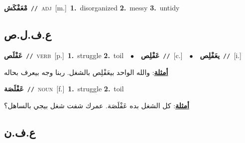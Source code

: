 \documentclass[10pt,a4paper,twoside]{article} %
\begin{document}
\begin{multicols}{2}
{\setlength\topsep{0pt}\textbf{\foreignlanguage{arabic}{مْعَفْكَش}}\ {\color{gray}\texttt{//}\color{black}}\ \textsc{adj}\ [m.]\ \textbf{1.}~disorganized  \textbf{2.}~messy  \textbf{3.}~untidy\ } \vspace{2mm}

\vspace{-3mm}
\subsection*{\color{blue}\foreignlanguage{arabic}{ع.ف.ل.ص}\color{blue}{}} 

{\setlength\topsep{0pt}\textbf{\foreignlanguage{arabic}{عَفْلَص}}\ {\color{gray}\texttt{//}\color{black}}\ \textsc{verb}\ [p.]\ \textbf{1.}~struggle  \textbf{2.}~toil\ \ $\bullet$\ \ \setlength\topsep{0pt}\textbf{\foreignlanguage{arabic}{عَفْلِص}}\ {\color{gray}\texttt{//}\color{black}}\ [c.]\ \ $\bullet$\ \ \setlength\topsep{0pt}\textbf{\foreignlanguage{arabic}{يعَفْلِص}}\ {\color{gray}\texttt{//}\color{black}}\ [i.]\  \begin{flushright}\color{gray}\foreignlanguage{arabic}{\textbf{\underline{\foreignlanguage{arabic}{أمثلة}}}: والله الواحد بيعَفْلِص بالشغل. ربنا وجه بيعرف بحاله}\end{flushright}\color{black}} \vspace{2mm}

{\setlength\topsep{0pt}\textbf{\foreignlanguage{arabic}{عَفْلَصَة}}\ {\color{gray}\texttt{//}\color{black}}\ \textsc{noun}\ [f.]\ \textbf{1.}~struggle  \textbf{2.}~toil\  \begin{flushright}\color{gray}\foreignlanguage{arabic}{\textbf{\underline{\foreignlanguage{arabic}{أمثلة}}}: كل الشغل بده عَفْلَصَة. عمرك شفت شغل بيجي بالساهل؟}\end{flushright}\color{black}} \vspace{2mm}

\vspace{-3mm}
\subsection*{\color{blue}\foreignlanguage{arabic}{ع.ف.ن}\color{blue}{}} 


\end{multicols}
\end{document}
